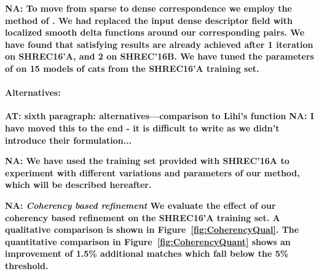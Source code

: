 \documentclass[10pt,twocolumn,letterpaper]{article}
\newcommand{\colornote}[3]{{\color{#1}\bf{#2: #3}\normalfont}}
\newcommand{\colornote}[3]{}
\newcommand {\ayellet}[1]{\colornote{blue}{AT}{#1}}
\newcommand {\nadav}[1]{\colornote{red}{NA}{#1}}
\begin{document}
\nadav{
To move from sparse to dense correspondence we employ the method of \cite{litany2017fully}. 
We had replaced the input dense descriptor field with localized smooth delta functions around our corresponding pairs.
We have found that satisfying results are already achieved after 1 iteration on SHREC16'A, and 2 on SHREC'16B. We have tuned the parameters of \cite{litany2017fully} on 15 models of cats from the SHREC16'A training set.}


\paragraph{Alternatives:} 
\ayellet{sixth paragraph: alternatives---comparison to Lihi's function}
\nadav{I have moved this to the end - it is difficult to write as we didn't introduce their formulation...}

\nadav{ We have used the training set provided with SHREC'16A to experiment with different variations and parameters of our method, which will be described hereafter.}

\nadav{\textit{Coherency based refinement} We evaluate the effect of our coherency based refinement on the SHREC16'A training set. A qualitative comparison is shown in Figure~\ref{fig:CoherencyQual}. The quantitative comparison in Figure~\ref{fig:CoherencyQuant}   shows an improvement of 1.5\% additional matches which fall below the 5\% threshold.}
\end{document}

